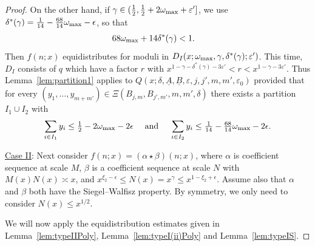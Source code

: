 \documentclass{amsart}
\numberwithin{equation}{section}
\begin{document}
\begin{proof}
 
\medskip On the other hand, if $\gamma \in (\frac{1}{2},\frac{1}{2} + 2\omega_{\begin{scriptsize}\mbox{max}\end{scriptsize}} + \varepsilon']$, we use  $
\delta^*(\gamma) =   \tfrac{1}{14}-\tfrac{68}{14}\omega_{\begin{scriptsize}
\mbox{max}
\end{scriptsize}} -\epsilon 
$, so that 
\begin{align}
 &68\omega_{\begin{scriptsize}
\mbox{max}
\end{scriptsize}} + 14 \delta^*(\gamma)    <1.
\end{align}  
Then $f(n;x)$ equidistributes for moduli in $D_I(x;\omega_{\begin{scriptsize}
\mbox{max}
\end{scriptsize}},\gamma,\delta^*(\gamma);\varepsilon')$. This time, $D_I$ consists of $q$ which have a factor 
  $r$ with $x^{1-\gamma-\delta^*(\gamma) -3\varepsilon'} < r < x^{1-\gamma - 3\varepsilon'} $. Thus Lemma~\ref{lem:partition1} applies to 
$ Q(x;\delta,\underline{A},\underline{B},\varepsilon,j,j',m,m',\varepsilon_0) $  provided that for  every  $(y_1, \dots, y_{m+m'}) \in \Xi(B_{j,m},B_{j',m'},m,m',\delta)$  there exists a partition $I_1 \cup I_2$ with  
\begin{align}
\sum_{i \in I_1} y_i \leq \tfrac{1}{2} -2 \omega_{\begin{scriptsize}
\mbox{max}\end{scriptsize}} -2\epsilon \quad \mbox{ and } \quad  \sum_{i \in I_2} y_i \leq \tfrac{1}{14}-\tfrac{68}{14}\omega_{\begin{scriptsize}
\mbox{max}
\end{scriptsize}}     -2\epsilon. 
\end{align}
 


\medskip
\underline{Case II}: Next consider $f(n;x) = (\alpha \star \beta)(n;x)$, where $\alpha$ is  coefficient sequence at scale $M$, $\beta$ is a  coefficient sequence at scale $N$ with $M(x) N(x) \asymp x$, and $x^{ \xi_2 -\epsilon  } \leq N(x)=x^\gamma \leq x^{ 1- \xi_2+\epsilon}$. Assume also that $\alpha$ and $\beta$ both have the Siegel--Walfisz property.    By symmetry, we only need to consider $N(x) \leq x^{1/2}$. 

\medskip

We will now apply the equidistribution estimates given in Lemma~\ref{lem:typeIIPoly}, Lemma~\ref{lem:typeI(ii)Poly} and Lemma~\ref{lem:typeIS}.


\end{proof}
\end{document}
